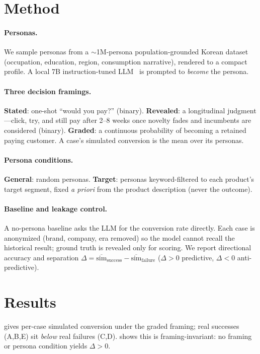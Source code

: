 \documentclass{article}
\begin{document}
\section{Method}
\label{sec:method}
\paragraph{Personas.} We sample personas from a $\sim$1M-persona
population-grounded Korean dataset~\citep{nemotron} (occupation, education, region,
consumption narrative), rendered to a compact profile. A local 7B
instruction-tuned LLM~\citep{qwen25} is prompted to \emph{become} the persona.
\paragraph{Three decision framings.} \textbf{Stated}: one-shot ``would you pay?''
(binary). \textbf{Revealed}: a longitudinal judgment---click, try, and still pay
after 2--8 weeks once novelty fades and incumbents are considered (binary).
\textbf{Graded}: a continuous probability of becoming a retained paying customer.
A case's simulated conversion is the mean over its personas.
\paragraph{Persona conditions.} \textbf{General}: random personas.
\textbf{Target}: personas keyword-filtered to each product's target segment, fixed
\emph{a priori} from the product description (never the outcome).
\paragraph{Baseline and leakage control.} A no-persona baseline asks the LLM for
the conversion rate directly. Each case is anonymized (brand, company, era
removed) so the model cannot recall the historical result; ground truth is
revealed only for scoring. We report directional accuracy and separation
$\Delta=\overline{\text{sim}}_{\text{success}}-\overline{\text{sim}}_{\text{failure}}$
($\Delta>0$ predictive, $\Delta<0$ anti-predictive).

\section{Results}
\label{sec:results}
 gives per-case simulated conversion under the graded framing;
real successes (A,B,E) sit \emph{below} real failures (C,D). 
shows this is framing-invariant: no framing or persona condition yields $\Delta>0$.
\end{document}
